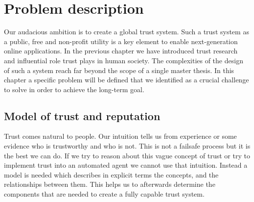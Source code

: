 \chapter{Problem description}
\label{chap:problem}

Our audacious ambition is to create a global trust system. Such a trust system as a public, free and 
non-profit utility is a key element to enable next-generation online applications. In the 
previous chapter we have introduced trust research and influential role trust plays in human 
society. The complexities of the design of such a system reach far beyond the scope of a single 
master thesis. In this chapter a specific problem will be defined that we identified as a crucial
challenge to solve in order to achieve the long-term goal.

\section{Model of trust and reputation}
Trust comes natural to people. Our intuition tells us from experience or some evidence who is 
trustworthy and who is not. This is not a failsafe process but it is the best we can do. If we try
to reason about this vague concept of trust or try to implement trust into an automated agent we
cannot use that intuition. Instead a model is needed which describes in explicit terms the 
concepts, and the relationships between them. This helps us to afterwards determine the components 
that are needed to create a fully capable trust system.

